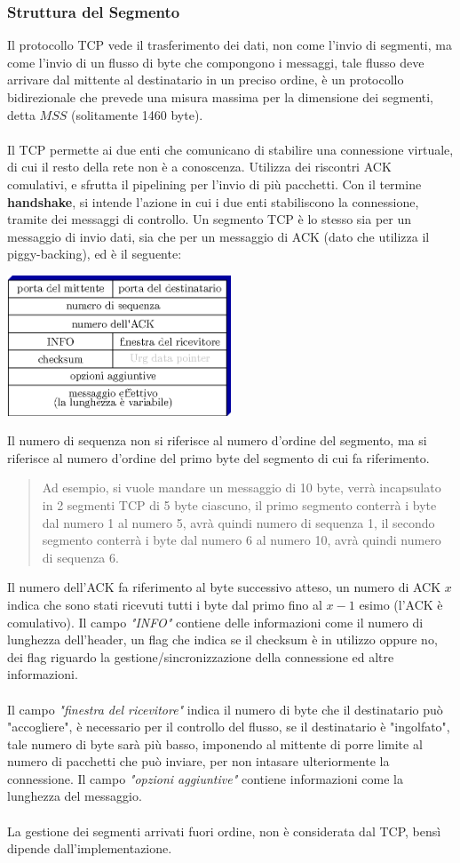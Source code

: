 \documentclass[12pt, letterpaper]{article}
\newcommand{\acc}{\\\hphantom{}\\}
\begin{document}
\subsubsection{Struttura del Segmento}
Il protocollo TCP vede il trasferimento dei dati, non come l'invio di segmenti, ma come l'invio di un 
flusso di byte che compongono i messaggi, tale flusso deve arrivare dal mittente al destinatario in un 
preciso ordine, è un protocollo bidirezionale che prevede una misura massima per la dimensione dei segmenti, 
detta $MSS$ (solitamente 1460 byte).\acc 
Il TCP permette ai due enti che comunicano di stabilire una connessione virtuale, di cui il resto della rete 
non è a conoscenza. Utilizza dei riscontri ACK comulativi, e sfrutta il pipelining per l'invio di più 
pacchetti. Con il termine \textbf{handshake}, si intende l'azione in cui i due enti stabiliscono la 
connessione, tramite dei messaggi di controllo. Un segmento TCP è lo stesso sia per un messaggio di invio dati, sia 
che per un messaggio di ACK (dato che utilizza il piggy-backing), ed è il seguente:\begin{center}
    \includegraphics[width=0.5\textwidth ]{images/TCPsegment.eps}
\end{center} 
Il numero di sequenza non si riferisce al numero d'ordine del segmento, ma si riferisce al numero d'ordine 
del primo byte del segmento di cui fa riferimento.\begin{quote}\color{gray}
    Ad esempio, si vuole mandare un messaggio di 10 byte, verrà incapsulato in 2 segmenti TCP di 
    5 byte ciascuno, il primo segmento conterrà i byte dal numero 1 al numero 5, avrà quindi numero di 
    sequenza 1, il secondo segmento conterrà i byte dal numero 6 al numero 10, avrà quindi numero di 
    sequenza 6.\color{black}
\end{quote}
Il numero dell'ACK fa riferimento al byte successivo atteso, un numero di ACK $x$ indica che sono stati ricevuti tutti 
i byte dal primo fino al $x-1$ esimo (l'ACK è comulativo). Il campo \textit{"INFO"} contiene delle informazioni come il numero di lunghezza 
dell'header, un flag che indica se il checksum è in utilizzo oppure no, dei flag riguardo la gestione/sincronizzazione 
della connessione ed altre informazioni.\acc 
Il campo \textit{"finestra del ricevitore"} indica il numero di byte che il destinatario può "accogliere", 
 è necessario per il controllo del flusso, se il destinatario è "ingolfato", tale numero 
di byte sarà più basso, imponendo al mittente di porre limite al numero di pacchetti che può inviare, per non intasare 
ulteriormente la connessione. Il campo \textit{"opzioni aggiuntive"} contiene informazioni come la lunghezza 
del messaggio.\acc 
La gestione dei segmenti arrivati fuori ordine, non è considerata dal TCP, bensì dipende dall'implementazione.
\end{document}
